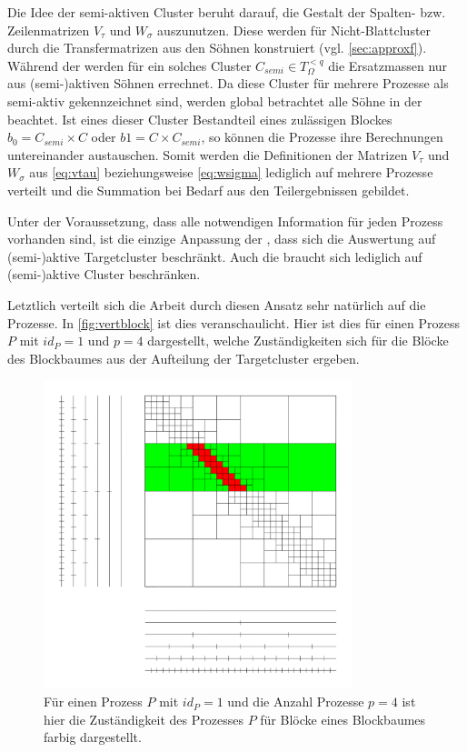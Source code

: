     Die Idee der semi-aktiven Cluster beruht darauf, die Gestalt der Spalten- bzw. Zeilenmatrizen $V_\tau$ und $W_\sigma$ auszunutzen. Diese werden für Nicht-Blattcluster durch die Transfermatrizen 
    aus den Söhnen konstruiert (vgl. \autoref{sec:approxf}). Während der \vorw werden für ein solches Cluster $C_{semi} \in T_\Omega^{<q}$ die Ersatzmassen nur aus (semi-)aktiven Söhnen
    errechnet. Da diese Cluster für mehrere Prozesse als semi-aktiv gekennzeichnet sind, werden global betrachtet alle Söhne in der \vorw beachtet. Ist eines dieser Cluster Bestandteil
    eines zulässigen Blockes $b_0 = C_{semi} \times C$ oder $b1 = C \times C_{semi}$, so können die Prozesse ihre Berechnungen untereinander austauschen. Somit werden die Definitionen der Matrizen
    $V_\tau$ und $W_\sigma$ aus \autoref{eq:vtau} beziehungsweise \autoref{eq:wsigma} lediglich auf mehrere Prozesse verteilt und die Summation bei Bedarf aus den Teilergebnissen gebildet.
    
    Unter der Voraussetzung, dass alle notwendigen Information für jeden Prozess vorhanden sind, ist die einzige Anpassung der \koppl, dass sich die Auswertung auf (semi-)aktive
    Targetcluster beschränkt. Auch die \ruckw braucht sich lediglich auf (semi-)aktive Cluster beschränken.
    
    Letztlich verteilt sich die Arbeit durch diesen Ansatz sehr natürlich auf die Prozesse. In \autoref{fig:vertblock} ist dies veranschaulicht. Hier ist dies für einen Prozess $P$ mit $id_P = 1$ 
    und $p = 4$ dargestellt, welche Zuständigkeiten sich für die Blöcke des Blockbaumes aus der Aufteilung der Targetcluster ergeben.
    
    \begin{figure}[b]
      \includegraphics[width=0.8\textwidth]{img/verteilter_blockbaum.png}
      \caption{Für einen Prozess $P$ mit $id_P = 1$ und die Anzahl Prozesse $p = 4$ ist hier die Zuständigkeit des Prozesses $P$ für Blöcke eines Blockbaumes farbig dargestellt.}
      \label{fig:vertblock}
    \end{figure}


